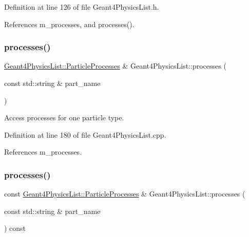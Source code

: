 Definition at line 126 of file Geant4\+Physics\+List.\+h.



References m\+\_\+processes, and processes().

\hypertarget{class_d_d4hep_1_1_simulation_1_1_geant4_physics_list_afb286f542ca7d94a0eb1831dd340c846}{}\label{class_d_d4hep_1_1_simulation_1_1_geant4_physics_list_afb286f542ca7d94a0eb1831dd340c846} 
\subsubsection{\texorpdfstring{processes()}{processes()}\hspace{0.1cm}{\footnotesize\ttfamily [3/4]}}
{\footnotesize\ttfamily \hyperlink{class_d_d4hep_1_1_simulation_1_1_geant4_physics_list_adf5c4ae6ed4befac883cf5f253f4220e}{Geant4\+Physics\+List\+::\+Particle\+Processes} \& Geant4\+Physics\+List\+::processes (\begin{DoxyParamCaption}\item[{const std\+::string \&}]{part\+\_\+name }\end{DoxyParamCaption})}



Access processes for one particle type. 



Definition at line 180 of file Geant4\+Physics\+List.\+cpp.



References m\+\_\+processes.

\hypertarget{class_d_d4hep_1_1_simulation_1_1_geant4_physics_list_a761f0e6fcc0e3c9ab8e7c4895d6c0aa0}{}\label{class_d_d4hep_1_1_simulation_1_1_geant4_physics_list_a761f0e6fcc0e3c9ab8e7c4895d6c0aa0} 
\subsubsection{\texorpdfstring{processes()}{processes()}\hspace{0.1cm}{\footnotesize\ttfamily [4/4]}}
{\footnotesize\ttfamily const \hyperlink{class_d_d4hep_1_1_simulation_1_1_geant4_physics_list_adf5c4ae6ed4befac883cf5f253f4220e}{Geant4\+Physics\+List\+::\+Particle\+Processes} \& Geant4\+Physics\+List\+::processes (\begin{DoxyParamCaption}\item[{const std\+::string \&}]{part\+\_\+name }\end{DoxyParamCaption}) const}



